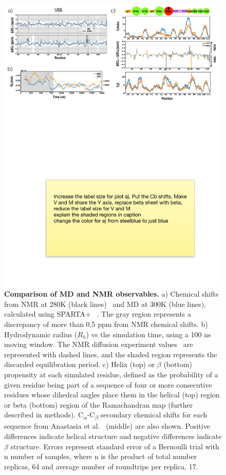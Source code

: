 \documentclass[10pt,letterpaper]{article}
\begin{document}
\begin{figure}[!ht]
\includegraphics[scale=0.5,width=\textwidth,trim={0 0cm 0 0cm},clip]{../figures/fig2.pdf}
\caption{{\bf Comparison of MD and NMR observables.} a) Chemical shifts from NMR at 280K (black lines)~\cite{Anastasia2013} and MD at 300K (blue lines), calculated using SPARTA+ ~\cite{Shen2010}. The gray region represents a discrepancy of more than 0.5 ppm from NMR chemical shifts. b) Hydrodynamic radius ($R_{h}$) vs the simulation time, using a 100 ns moving window. The NMR diffusion experiment values~\cite{Anastasia2013} are represented with dashed lines, and the shaded region represents the discarded equilibration period. c) Helix (top) or $\beta$ (bottom) propensity at each simulated residue, defined as the probability of a given residue being part of a sequence of four or more consecutive residues whose dihedral angles place them in the helical (top) region or beta (bottom) region of the Ramachandran map (further described in methods). C\textsubscript{$\alpha$}-C\textsubscript{$\beta$} secondary chemical shifts for each sequence from Anastasia et al.~\cite{Anastasia2013} (middle) are also shown. Positive differences indicate helical structure and negative differences indicate $\beta$ structure. Errors represent standard error of a Bernoulli trial with n number of samples, where n is the product of total number replicas, 64 and average number of roundtrips per replica, 17.}
\label{fig2} 
\end{figure}
\end{document}
